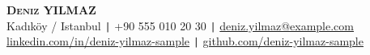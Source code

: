 \begin{center}
    \textbf{\Huge \scshape Deniz YILMAZ} \\[10pt]
    \small
    Kadıköy / Istanbul \quad \texttt{|} \quad +90 555 010 20 30 \quad \texttt{|} \quad \href{mailto:deniz.yilmaz@example.com}{deniz.yilmaz@example.com} \\[5pt]
    \href{https://www.linkedin.com/in/deniz-yilmaz-sample}{linkedin.com/in/deniz-yilmaz-sample} \quad \texttt{|} \quad
    \href{https://github.com/deniz-yilmaz-sample}{github.com/deniz-yilmaz-sample}
\end{center}
